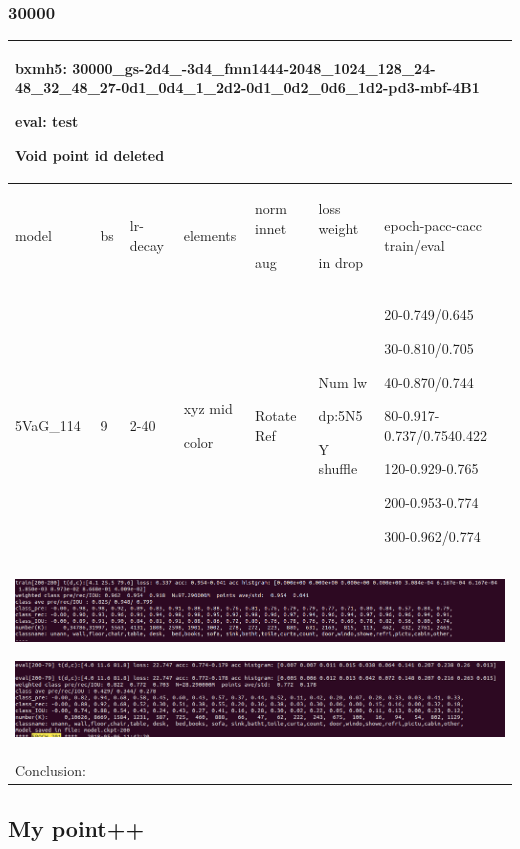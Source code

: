 \documentclass{article}
\begin{document}
\subsubsection{30000}
\begin{tabular}{|p{1.5cm}|p{1.5cm}|p{1cm}|p{1.5cm}|p{1.5cm}|p{1.5cm}|p{5cm}| }
	\hline
	\multicolumn{7}{|p{14cm}|}{bxmh5: 30000\_gs-2d4\_-3d4\_fmn1444-2048\_1024\_128\_24-48\_32\_48\_27-0d1\_0d4\_1\_2d2-0d1\_0d2\_0d6\_1d2-pd3-mbf-4B1  \par eval: test \par Void point id deleted} \\
	\hline
	model & bs& lr-decay & elements & norm innet\par aug & loss weight\par in drop & epoch-pacc-cacc train/eval \\
	\hline
	
	5VaG\_114 & 9 &2-40 & xyz mid\par color & Rotate Ref & Num lw\par dp:5N5\par Y shuffle & 20-0.749/0.645\par 30-0.810/0.705\par 40-0.870/0.744\par 80-0.917-0.737/0.7540.422\par 120-0.929-0.765\par 200-0.953-0.774\par 300-0.962/0.774\\
	\hline
	\multicolumn{7}{|p{14cm}|}{ \includegraphics[width=\textheight]{images/svoxel/novoid/train} \par 
	\includegraphics[width=\textheight]{images/svoxel/novoid/test}} \\
	\hline
	
	\multicolumn{7}{|p{14cm}|}{ Conclusion:\par	 } \\
	\hline
\end{tabular}

\subsection{My point++}	
\end{document}
